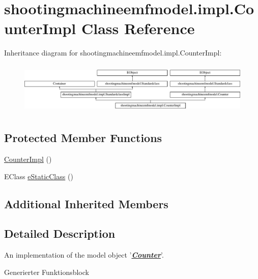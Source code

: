 \hypertarget{classshootingmachineemfmodel_1_1impl_1_1_counter_impl}{\section{shootingmachineemfmodel.\-impl.\-Counter\-Impl Class Reference}
\label{classshootingmachineemfmodel_1_1impl_1_1_counter_impl}
}
Inheritance diagram for shootingmachineemfmodel.\-impl.\-Counter\-Impl\-:\begin{figure}[H]
\begin{center}
\leavevmode
\includegraphics[height=2.497213cm]{classshootingmachineemfmodel_1_1impl_1_1_counter_impl}
\end{center}
\end{figure}
\subsection*{Protected Member Functions}
\begin{DoxyCompactItemize}
\item 
\hyperlink{classshootingmachineemfmodel_1_1impl_1_1_counter_impl_a021688e3e928f0cdee4d7318a7924968}{Counter\-Impl} ()
\item 
E\-Class \hyperlink{classshootingmachineemfmodel_1_1impl_1_1_counter_impl_a903b1e1e49eef8c1a71a80f1f24ab59a}{e\-Static\-Class} ()
\end{DoxyCompactItemize}
\subsection*{Additional Inherited Members}


\subsection{Detailed Description}
An implementation of the model object '{\itshape {\bfseries \hyperlink{interfaceshootingmachineemfmodel_1_1_counter}{Counter}}}'.

Generierter Funktionsblock 

